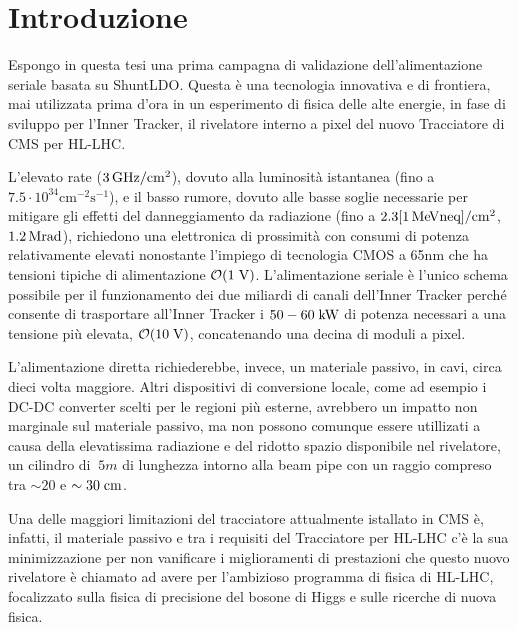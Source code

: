 \chapter{Introduzione}

Espongo in questa tesi una prima campagna di validazione dell'alimentazione seriale basata su ShuntLDO. Questa \`e una tecnologia innovativa e di frontiera, mai utilizzata prima d'ora in un esperimento di fisica delle alte energie, in fase di sviluppo per l'Inner Tracker, il rivelatore interno a pixel del nuovo Tracciatore di CMS per HL-LHC. 

L'elevato rate ($3{\rm \, GHz}/\mathrm{cm^2}$), dovuto alla luminosit\`a istantanea (fino a $\mathrm{7.5\cdot 10^{34}cm^{-2}s^{-1}}$), e il basso rumore, dovuto alle basse soglie necessarie per mitigare gli effetti del danneggiamento da radiazione (fino a $\mathrm{2.3 [1{\rm \, Me\kern-0.125em V} neq]/cm^2}$, $1.2{\rm \, Mrad}$), richiedono una elettronica di prossimit\`a con consumi di potenza relativamente elevati nonostante l'impiego di tecnologia CMOS a 65nm che ha tensioni tipiche di alimentazione ${\cal O}(1\rm \; V)$. L'alimentazione seriale \`e l'unico schema possibile per il funzionamento dei due miliardi di canali dell'Inner Tracker perch\'e consente di trasportare all'Inner Tracker i $50-60\rm \; kW$ di potenza necessari a una tensione pi\`u elevata, ${\cal O}(10\rm \; V)$, concatenando una decina di moduli a pixel.


L'alimentazione diretta richiederebbe, invece, un materiale passivo, in cavi, circa dieci volta maggiore. Altri dispositivi di conversione locale, come ad esempio i DC-DC converter scelti per le regioni pi\`u esterne, avrebbero un impatto non marginale sul materiale passivo, ma non possono comunque essere utillizati a causa della elevatissima radiazione e del ridotto spazio disponibile nel rivelatore, un cilindro di $~5m$ di lunghezza intorno alla beam pipe con un raggio compreso tra $\sim20$ e $\sim 30\rm \; cm$.

Una delle maggiori limitazioni del tracciatore attualmente istallato in CMS \`e, infatti, il materiale passivo e tra i requisiti del Tracciatore per HL-LHC c'\`e la sua minimizzazione per non vanificare i miglioramenti di prestazioni che questo nuovo rivelatore \`e chiamato ad avere per l'ambizioso programma di fisica di HL-LHC, focalizzato sulla fisica di precisione del bosone di Higgs e sulle ricerche di nuova fisica. 

